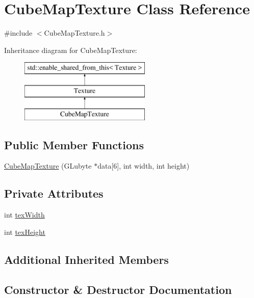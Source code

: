 \hypertarget{class_cube_map_texture}{}\section{Cube\+Map\+Texture Class Reference}
\label{class_cube_map_texture}


{\ttfamily \#include $<$Cube\+Map\+Texture.\+h$>$}

Inheritance diagram for Cube\+Map\+Texture\+:\begin{figure}[H]
\begin{center}
\leavevmode
\includegraphics[height=3.000000cm]{class_cube_map_texture}
\end{center}
\end{figure}
\subsection*{Public Member Functions}
\begin{DoxyCompactItemize}
\item 
\hyperlink{class_cube_map_texture_adf0b01d1180ddc452ed1cf02bf5f7687}{Cube\+Map\+Texture} (G\+Lubyte $\ast$data\mbox{[}6\mbox{]}, int width, int height)
\end{DoxyCompactItemize}
\subsection*{Private Attributes}
\begin{DoxyCompactItemize}
\item 
int \hyperlink{class_cube_map_texture_a7890234be6ca631a5f17a9ab9d7e597c}{tex\+Width}
\item 
int \hyperlink{class_cube_map_texture_ad7cb6fe0f1405749dac36016772b4de9}{tex\+Height}
\end{DoxyCompactItemize}
\subsection*{Additional Inherited Members}


\subsection{Constructor \& Destructor Documentation}
\hypertarget{class_cube_map_texture_adf0b01d1180ddc452ed1cf02bf5f7687}{}\label{class_cube_map_texture_adf0b01d1180ddc452ed1cf02bf5f7687} 
